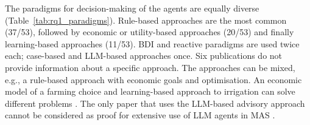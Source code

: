 \documentclass[11pt,a4paper]{article}
\begin{document}
The paradigms for decision-making of the agents are equally diverse
(Table~\ref{tab:rq1_paradigms}). Rule-based approaches are the most common (37/53), followed by economic or utility-based approaches
(20/53) and finally learning-based approaches (11/53). BDI and reactive
paradigms are used twice each; case-based and LLM-based approaches
once. Six publications do not provide information about a specific
approach. The approaches can be mixed, e.g., a rule-based approach
with economic goals and optimisation. An economic model of a
farming choice and learning-based approach to irrigation can
solve different problems \parencite{berger_agent-based_2001,grovermann_smart_2017,
agyeman_learning-based_2024}. The only paper that uses the LLM-based
advisory approach cannot be considered as proof for extensive
use of LLM agents in MAS \parencite{t_shanteer_cownet-ai_2026}.
\end{document}
